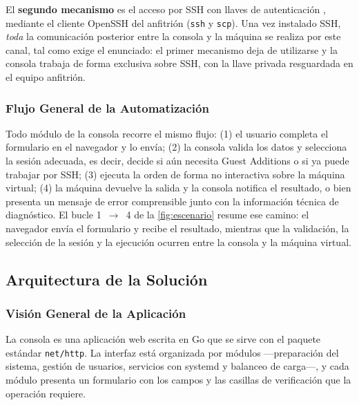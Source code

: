 El \textbf{segundo mecanismo} es el acceso por SSH con llaves de autenticación
\parencite{rfc4252}, mediante el cliente OpenSSH del anfitrión
(\texttt{ssh} y \texttt{scp}). Una vez instalado SSH, \emph{toda} la
comunicación posterior entre la consola y la máquina se realiza por este
canal, tal como exige el enunciado: el primer mecanismo deja de utilizarse y
la consola trabaja de forma exclusiva sobre SSH, con la llave privada
resguardada en el equipo anfitrión.

\subsubsection{Flujo General de la Automatización}
\label{sec:flujo-escenario}

Todo módulo de la consola recorre el mismo flujo: (1) el usuario completa
el formulario en el navegador y lo envía; (2) la consola valida los datos
y selecciona la sesión adecuada, es decir, decide si aún necesita Guest
Additions o si ya puede trabajar por SSH; (3) ejecuta la orden de forma
no interactiva sobre la máquina virtual; (4) la máquina devuelve la
salida y la consola notifica el resultado, o bien presenta un mensaje de
error comprensible junto con la información técnica de diagnóstico.
El bucle 1~$\rightarrow$~4 de la \cref{fig:escenario} resume ese
camino: el navegador envía el formulario y recibe el resultado, mientras
que la validación, la selección de la sesión y la ejecución ocurren
entre la consola y la máquina virtual.

\subsection{Arquitectura de la Solución}
\label{sec:arquitectura}

\subsubsection{Visión General de la Aplicación}
\label{sec:vision-general}

La consola es una aplicación web escrita en Go que se sirve con el
paquete estándar \texttt{net/http}. La interfaz está organizada por
módulos ---preparación del sistema, gestión de usuarios, servicios con
systemd y balanceo de carga---, y cada módulo presenta un formulario con
los campos y las casillas de verificación que la operación requiere.

